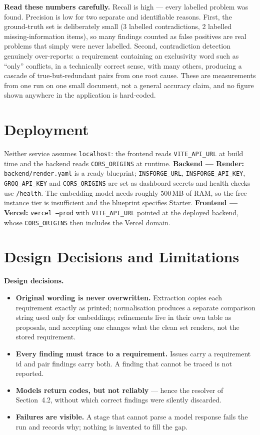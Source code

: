\textbf{Read these numbers carefully.} Recall is high --- every labelled problem
was found. Precision is low for two separate and identifiable reasons. First,
the ground-truth set is deliberately small (3 labelled contradictions, 2
labelled missing-information items), so many findings counted as false
positives are real problems that simply were never labelled. Second,
contradiction detection genuinely over-reports: a requirement containing an
exclusivity word such as ``only'' conflicts, in a technically correct sense,
with many others, producing a cascade of true-but-redundant pairs from one root
cause. These are measurements from one run on one small document, not a general
accuracy claim, and no figure shown anywhere in the application is hard-coded.

\section{Deployment}

Neither service assumes \texttt{localhost}: the frontend reads
\texttt{VITE\_API\_URL} at build time and the backend reads
\texttt{CORS\_ORIGINS} at runtime. \textbf{Backend --- Render:}
\texttt{backend/render.yaml} is a ready blueprint; \texttt{INSFORGE\_URL},
\texttt{INSFORGE\_API\_KEY}, \texttt{GROQ\_API\_KEY} and \texttt{CORS\_ORIGINS}
are set as dashboard secrets and health checks use \texttt{/health}. The
embedding model needs roughly 500\,MB of RAM, so the free instance tier is
insufficient and the blueprint specifies Starter. \textbf{Frontend --- Vercel:}
\texttt{vercel --prod} with \texttt{VITE\_API\_URL} pointed at the deployed
backend, whose \texttt{CORS\_ORIGINS} then includes the Vercel domain.

\section{Design Decisions and Limitations}

\textbf{Design decisions.}
\begin{itemize}
  \item \textbf{Original wording is never overwritten.} Extraction copies each requirement exactly as printed; normalisation produces a separate comparison string used only for embeddings; refinements live in their own table as proposals, and accepting one changes what the clean set renders, not the stored requirement.
  \item \textbf{Every finding must trace to a requirement.} Issues carry a requirement id and pair findings carry both. A finding that cannot be traced is not reported.
  \item \textbf{Models return codes, but not reliably} --- hence the resolver of Section~4.2, without which correct findings were silently discarded.
  \item \textbf{Failures are visible.} A stage that cannot parse a model response fails the run and records why; nothing is invented to fill the gap.
\end{itemize}

